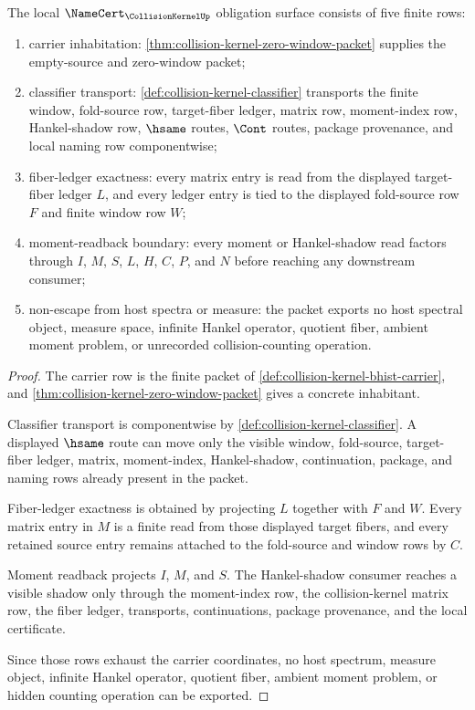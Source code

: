 \begin{theorem}
\label{thm:collision-kernel-namecert-obligation-surface}
The local $\NameCert_{\CollisionKernelUp}$ obligation surface consists of five finite rows:
\begin{enumerate}
\item carrier inhabitation: \autoref{thm:collision-kernel-zero-window-packet} supplies the empty-source and zero-window packet;
\item classifier transport: \autoref{def:collision-kernel-classifier} transports the finite window, fold-source row, target-fiber ledger, matrix row, moment-index row, Hankel-shadow row, $\hsame$ routes, $\Cont$ routes, package provenance, and local naming row componentwise;
\item fiber-ledger exactness: every matrix entry is read from the displayed target-fiber ledger $L$, and every ledger entry is tied to the displayed fold-source row $F$ and finite window row $W$;
\item moment-readback boundary: every moment or Hankel-shadow read factors through $I$, $M$, $S$, $L$, $H$, $C$, $P$, and $N$ before reaching any downstream consumer;
\item non-escape from host spectra or measure: the packet exports no host spectral object, measure space, infinite Hankel operator, quotient fiber, ambient moment problem, or unrecorded collision-counting operation.
\end{enumerate}
\end{theorem}
\begin{proof}
The carrier row is the finite packet of \autoref{def:collision-kernel-bhist-carrier}, and \autoref{thm:collision-kernel-zero-window-packet} gives a concrete inhabitant.

Classifier transport is componentwise by \autoref{def:collision-kernel-classifier}. A displayed $\hsame$ route can move only the visible window, fold-source, target-fiber ledger, matrix, moment-index, Hankel-shadow, continuation, package, and naming rows already present in the packet.

Fiber-ledger exactness is obtained by projecting $L$ together with $F$ and $W$. Every matrix entry in $M$ is a finite read from those displayed target fibers, and every retained source entry remains attached to the fold-source and window rows by $C$.

Moment readback projects $I$, $M$, and $S$. The Hankel-shadow consumer reaches a visible shadow only through the moment-index row, the collision-kernel matrix row, the fiber ledger, transports, continuations, package provenance, and the local certificate.

Since those rows exhaust the carrier coordinates, no host spectrum, measure object, infinite Hankel operator, quotient fiber, ambient moment problem, or hidden counting operation can be exported.
\end{proof}

